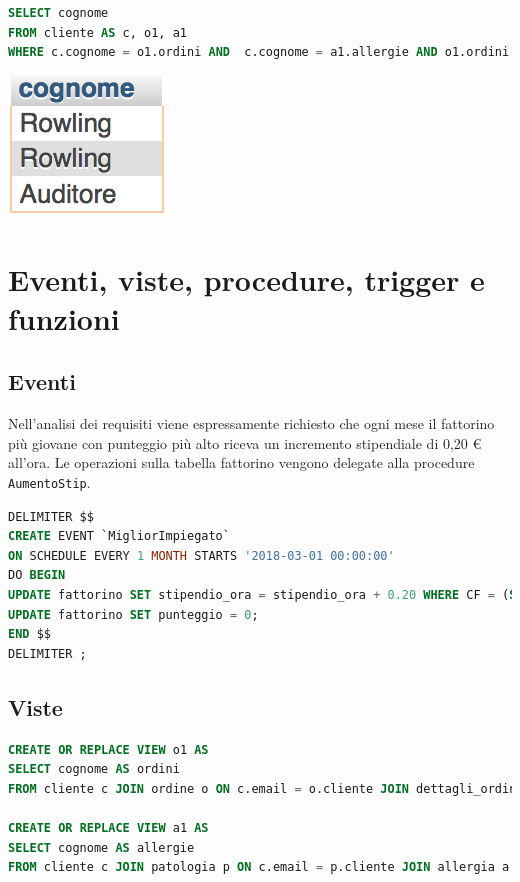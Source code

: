 \documentclass[10pt]{article}
\begin{document}
\begin{enumerate}[noitemsep]
\begin{lstlisting}[language=sql]
SELECT cognome
FROM cliente AS c, o1, a1
WHERE c.cognome = o1.ordini AND  c.cognome = a1.allergie AND o1.ordini = a1.allergie
\end{lstlisting}	
\begin{center}
\hspace*{-1cm}
\includegraphics[scale=0.9]{query3.png}
\hspace*{-1cm}
\end{center}

	\end{enumerate}
		\section{Eventi, viste,  procedure, trigger e funzioni}
		\subsection{Eventi}
		Nell'analisi dei requisiti viene espressamente richiesto che ogni mese il fattorino pi\`u giovane con punteggio pi\`u alto riceva un incremento stipendiale di 0,20 \euro{} all'ora.
		Le operazioni sulla tabella fattorino vengono delegate alla procedure \texttt{AumentoStip}.
\begin{lstlisting}[language=sql]
DELIMITER $$
CREATE EVENT `MigliorImpiegato` 
ON SCHEDULE EVERY 1 MONTH STARTS '2018-03-01 00:00:00'
DO BEGIN 
UPDATE fattorino SET stipendio_ora = stipendio_ora + 0.20 WHERE CF = (SELECT CF FROM fattorino WHERE CF NOT IN (SELECT f1.CF FROM fattorino f1 CROSS JOIN fattorino f2 WHERE f1.data_di_nascita < f2.data_di_nascita AND f1.punteggio < f2.punteggio AND f1.CF != f2.CF));
UPDATE fattorino SET punteggio = 0;
END $$
DELIMITER ;
\end{lstlisting}
	\subsection{Viste}
	\begin{lstlisting}[language=sql]
CREATE OR REPLACE VIEW o1 AS
SELECT cognome AS ordini
FROM cliente c JOIN ordine o ON c.email = o.cliente JOIN dettagli_ordine as do ON o.codice = do.ordine

CREATE OR REPLACE VIEW a1 AS
SELECT cognome AS allergie
FROM cliente c JOIN patologia p ON c.email = p.cliente JOIN allergia a ON p.allergia = a.codice
	\end{lstlisting}
\end{document}
